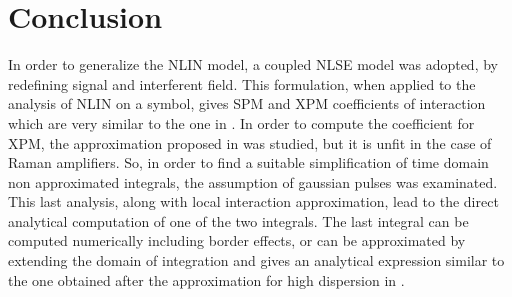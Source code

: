 \documentclass[10pt, lettersize, journal, onecolumn]{IEEEtran}
\begin{document}
\begin{comment}
Quindi dobbiamo verificare la seguente uguaglianza
\begin{equation}
	U_0 \sqrt{\dfrac{1+iD(z)}{1+D^2(z)}} \exp\left[-\dfrac{t^2}{2T_0^2} \dfrac{1+iD(z)}{1+D^2(z)}\right]  \stackrel{?}{=}  U_0 \sqrt{\frac{i}{2\pi D(z)}} \exp\left[-\dfrac{t^2}{2T_0^2} \left(\dfrac{1}{D^2(z)}\right)\right]
\end{equation}
Queste espressioni non sembrano tuttavia combaciare esattamente. Possiamo approssimare il termine di sinistra, per $D(z)>>1$ con
\begin{equation}
	U_0 \sqrt{\dfrac{i}{D(z)}} \exp\left[-\dfrac{t^2}{2T_0^2} \dfrac{1}{D^2(z)}\right] {\color{darkred} \exp\left[-\dfrac{t^2}{2T_0^2} \dfrac{i}{D(z)}\right]}
\end{equation}
tuttavia si nota che manca un termine $2\pi$ a \textit{denominatore}, e l'esponenziale di fase \textit{scompare} dall'espressione.

\vspace{20pt}
La conclusione \textit{provvisoria} è che l'approssimazione non vale in maniera esatta, ed anzi la sua validità nel caso gaussiano è da valutare in un'ulteriore analisi.
\end{comment}

\section{Conclusion}
In order to generalize the NLIN model, a coupled NLSE model was adopted, by redefining signal and interferent field. This formulation, when applied to the analysis of NLIN on a symbol, gives SPM and XPM coefficients of interaction which are very similar to the one in \cite{Dar_2013}. In order to compute the coefficient for XPM, the approximation proposed in \cite{Dar_2013} was studied, but it is unfit in the case of Raman amplifiers. So, in order to find a suitable simplification of time domain non approximated integrals, the assumption of gaussian pulses was examinated. This last analysis, along with local interaction approximation, lead to the direct analytical computation of one of the two integrals. The last integral can be computed numerically including border effects, or can be approximated by extending the domain of integration and gives an analytical expression similar to the one obtained after the approximation for high dispersion in \cite{Dar_2013}.

\printbibliography

\hrulefill
\end{document}
